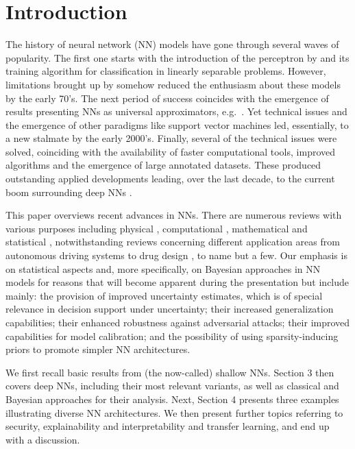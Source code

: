 
\section{Introduction}
The history of neural network (NN) models have gone 
through several waves of popularity. The first 
one starts with the introduction of the perceptron
by \cite{rosenblatt1958perceptron} and its training algorithm 
for classification in linearly separable problems.
However, limitations brought up by 
\cite{minsky} somehow reduced the enthusiasm
about these models by the early 70's.
The next period of success coincides with the emergence
of results presenting NNs as universal
approximators, e.g.\ \cite{cybenko1989approximation}. Yet 
technical issues and the emergence of other paradigms like 
support vector machines led, essentially,
to a new stalmate by the early 2000's. Finally, several of the 
technical issues were solved, coinciding with the 
availability of faster computational tools,
improved algorithms and the emergence of
large annotated datasets. These produced outstanding 
applied developments leading, over the last decade, to the current boom 
surrounding deep NNs \citep{deeplearningbook}. 

This paper overviews  
recent advances in NNs. 
There are numerous reviews with various purposes
including physical \citep{cirac}, computational \citep{chollet}, mathematical \citep{maths} and statistical \citep{Banks}, 
notwithstanding  reviews concerning different  application areas 
from autonomous driving systems \citep{rumanos} to
drug design \citep{hessler}, to name but a few. 
Our emphasis is on statistical
aspects and, more specifically, on Bayesian approaches
in NN models for reasons that will become 
apparent during the presentation but include mainly:
the provision of improved uncertainty estimates, which is
of special relevance in decision support under uncertainty; their 
increased generalization capabilities; their 
enhanced robustness against adversarial attacks; 
their improved capabilities for model calibration;
and the possibility of using sparsity-inducing priors
to promote simpler NN architectures.

We first recall basic results from (the now-called) 
shallow NNs.
Section 3 then covers deep NNs, including their most
relevant 
variants, as well as classical and Bayesian approaches
for their analysis. Next, Section 4
presents three examples illustrating
diverse NN architectures. We then present 
further topics referring to security, explainability and
interpretability and transfer 
learning, and end up with a discussion.

